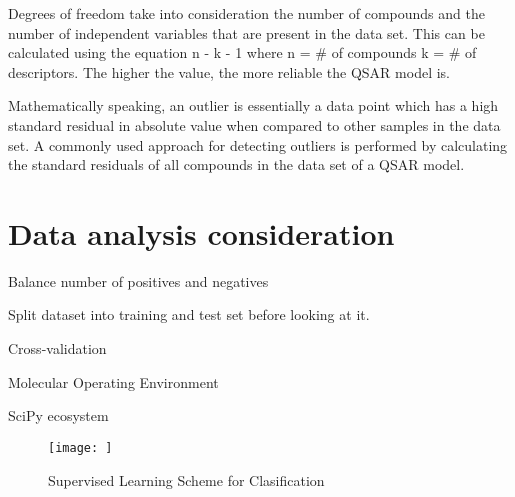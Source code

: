 
Degrees of freedom take into consideration the number of compounds and the number of independent variables that are present in the data set. This can be calculated using the equation n - k - 1 where n = \# of compounds k = \# of descriptors. The higher the value, the more reliable the QSAR model is. \cite{Nantasenamat2009}

Mathematically speaking, an outlier is essentially a data point which has a high standard residual in absolute value when compared to other samples in the data set. A commonly used approach for detecting outliers is performed by calculating the standard residuals of all compounds in the data set of a QSAR model. \cite{Nantasenamat2009}



\section{Data analysis consideration}
\begin{description}
\item Balance number of positives and negatives

\item Split dataset into training and test set before looking at it.

\item Cross-validation
\end{description}

\begin{description}
\item Molecular Operating Environment
\item SciPy ecosystem

\end{description}



\begin{figure}[h,t]
  \caption{Supervised Learning Scheme for Clasification}
  \centering
   \texttt{[image: ]}
\end{figure}

